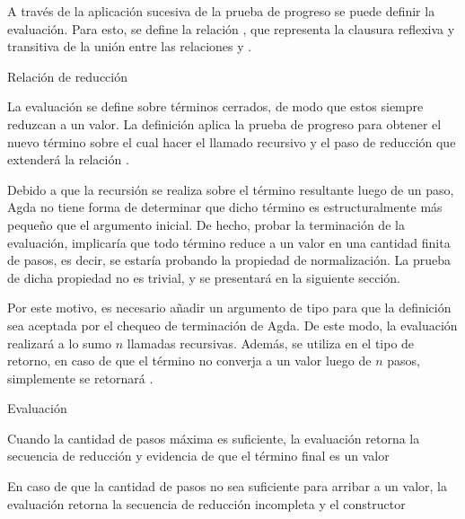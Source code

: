 A través de la aplicación sucesiva de la prueba de progreso se puede definir la evaluación.
Para esto, se define la relación \type{$\_\rightsquigarrow\_$}, que representa la clausura reflexiva y transitiva de la unión entre las relaciones \type{$\_\hookrightarrow\_$} y \type{$\_\rightleftarrows\_$}.

\begin{codigo}
	Relación de reducción
\end{codigo}

La evaluación se define sobre términos cerrados, de modo que estos siempre reduzcan a un valor.
La definición aplica la prueba de progreso para obtener el nuevo término sobre el cual hacer el llamado recursivo y el paso de reducción que extenderá la relación \type{$\_\rightsquigarrow\_$}.

Debido a que la recursión se realiza sobre el término resultante luego de un paso, Agda no tiene forma de determinar que dicho término es estructuralmente más pequeño que el argumento inicial.
De hecho, probar la terminación de la evaluación, implicaría que todo término reduce a un valor en una cantidad finita de pasos, es decir, se estaría probando la propiedad de normalización.
La prueba de dicha propiedad no es trivial, y se presentará en la siguiente sección.

Por este motivo, es necesario añadir un argumento de tipo  para que la definición sea aceptada por el chequeo de terminación de Agda.
De este modo, la evaluación realizará a lo sumo $n$ llamadas recursivas.
Además, se utiliza  en el tipo de retorno, en caso de que el término no converja a un valor luego de $n$ pasos, simplemente se retornará .


\begin{codigo}
	Evaluación
\end{codigo}

\begin{example}
	Cuando la cantidad de pasos máxima es suficiente, la evaluación retorna la secuencia de reducción y evidencia de que el término final es un valor
\end{example}

\begin{example}
	En caso de que la cantidad de pasos no sea suficiente para arribar a un valor, la evaluación retorna la secuencia de reducción incompleta y el constructor 
\end{example}

